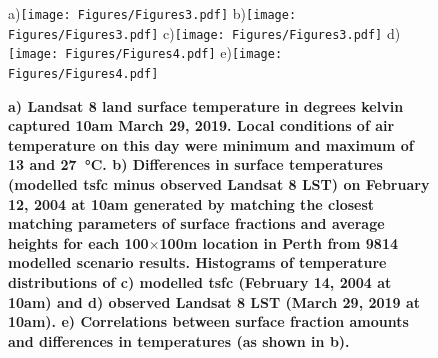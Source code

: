 \documentclass[final,3p,times,authoryear]{elsarticle}
\begin{document}
\begin{figure}  
\centering
a)\texttt{[image: Figures/Figures3.pdf]}
b)\texttt{[image: Figures/Figures3.pdf]}
c)\texttt{[image: Figures/Figures3.pdf]}
d)\texttt{[image: Figures/Figures4.pdf]}
e)\texttt{[image: Figures/Figures4.pdf]}
\caption{\bf a) Landsat 8 land surface temperature in degrees kelvin captured 10am March 29, 2019. Local conditions of air temperature on this day were minimum and maximum of 13 and 27\SI{}{\degreeCelsius}. b) Differences in surface temperatures (modelled \gls{tsfc} minus observed Landsat 8 LST) on February 12, 2004 at 10am generated by matching the closest matching parameters of surface fractions and average heights for each 100$\times$100m location in Perth from 9814 modelled scenario results. Histograms of temperature distributions of c) modelled \gls{tsfc} (February 14, 2004 at 10am) and d) observed Landsat 8 LST (March 29, 2019 at 10am). e) Correlations between surface fraction amounts and differences in temperatures (as shown in b). }
 \label{fig:Perth-Landsat-LST-29-03-2019}
 \label{fig:Perth-Landsat-TSFC-LST-29-03-2019}
 \label{fig:Perth_TSFC12_85}
\end{figure}
\end{document}
